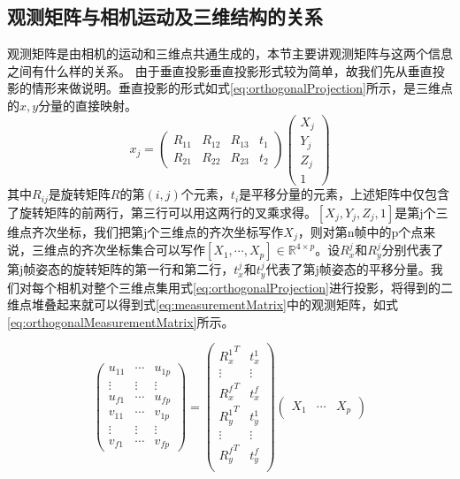 \subsection{观测矩阵与相机运动及三维结构的关系}\label{subsec:measurementMatrix}
观测矩阵是由相机的运动和三维点共通生成的，本节主要讲观测矩阵与这两个信息之间有什么样的关系。
由于垂直投影垂直投影形式较为简单，故我们先从垂直投影的情形来做说明\cite{Tomasi1992Shape}。垂直投影的形式如式\eqref{eq:orthogonalProjection}所示，是三维点的$x,y$分量的直接映射。
\begin{equation}\label{eq:orthogonalProjection}
x_j=
\begin{pmatrix}
R_{11} & R_{12} & R_{13} & t_1\\
R_{21} & R_{22} & R_{23} & t_2
\end{pmatrix}
\begin{pmatrix}
X_j\\Y_j\\Z_j\\1
\end{pmatrix}
\end{equation}
其中$R_{ij}$是旋转矩阵$R$的第$(i,j)$个元素，$t_i$是平移分量的元素，上述矩阵中仅包含了旋转矩阵的前两行，第三行可以用这两行的叉乘求得。$[X_j,Y_j,Z_j,1]$是第j个三维点齐次坐标，我们把第j个三维点的齐次坐标写作$X_j$，则对第n帧中的p个点来说，三维点的齐次坐标集合可以写作$[X_1,\cdots,X_p]\in \mathbb{R}^{4\times p}$。设$R_x^j$和$R_y^j$分别代表了第j帧姿态的旋转矩阵的第一行和第二行，$t_x^j$和$t_y^j$代表了第j帧姿态的平移分量。我们对每个相机对整个三维点集用式\eqref{eq:orthogonalProjection}进行投影，将得到的二维点堆叠起来就可以得到式\eqref{eq:measurementMatrix}中的观测矩阵，如式\eqref{eq:orthogonalMeasurementMatrix}所示。

\begin{equation}\label{eq:orthogonalMeasurementMatrix}
\begin{pmatrix}
u_{11}& \cdots & u_{1p}\\
\vdots& \vdots &\vdots\\
u_{f1}& \cdots & u_{fp}\\
v_{11}& \cdots & v_{1p}\\
\vdots& \vdots &\vdots\\
v_{f1}& \cdots & v_{fp}
\end{pmatrix}
=
\begin{pmatrix}
{R_x^1}^T & t_x^1\\
\vdots & \vdots\\
{R_x^f}^T & t_x^f\\
{R_y^1}^T & t_y^1\\
\vdots & \vdots\\
{R_y^f}^T & t_y^f\\
\end{pmatrix}
\begin{pmatrix}
X_1&\cdots &X_p
\end{pmatrix}
\end{equation}



